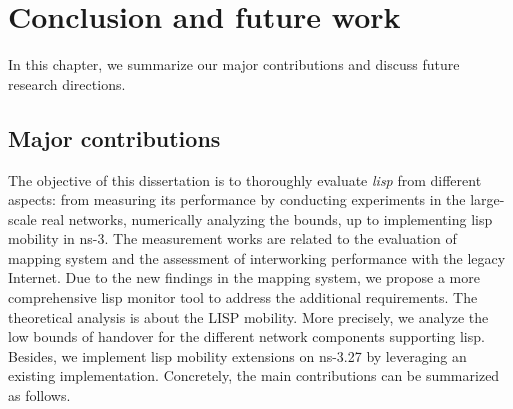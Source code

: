 
\chapter{Conclusion and future work}
\label{cha:conclusion}
In this chapter, we summarize our major contributions and discuss future research directions.

\section{Major contributions}
The objective of this dissertation is to thoroughly evaluate \emph{\acrfull{lisp}} from different aspects: from measuring its performance by conducting experiments in the large-scale real networks, numerically analyzing the bounds, up to implementing \acrshort{lisp} mobility in ns-3. The measurement works are related to the evaluation of mapping system and the assessment of interworking performance with the legacy Internet. Due to the new findings in the mapping system, we propose a more comprehensive \acrshort{lisp} monitor tool to address the additional requirements. The theoretical analysis is about the LISP mobility. More precisely, we analyze the low bounds of handover for the different network components supporting \acrshort{lisp}. Besides, we implement \acrshort{lisp} mobility extensions on ns-3.27 by leveraging an existing implementation. Concretely, the main contributions can be summarized as follows.

